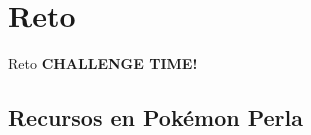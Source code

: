 \section{Reto}
\begin{frame}{Reto}
    \Huge\centering\textbf{CHALLENGE TIME!}
\end{frame}

\subsection{Recursos en Pokémon Perla}
\begin{frame}{}
\end{frame}
